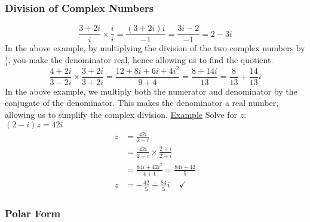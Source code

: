\documentclass[a4paper]{article}
\begin{document}
			\subsubsection{Division of Complex Numbers}
				\[
					\frac{3+2i}{i}\times\frac{i}{i}=\frac{(3+2i)i}{-1}=\frac{3i-2}{-1}=2-3i
				\]
				In the above example, by multiplying the division of the two complex numbers by $\frac{i}{i}$, you make the denominator real, hence allowing us to find the quotient.
				\[
					\frac{4+2i}{3-2i}\times\frac{3+2i}{3+2i}=\frac{12+8i+6i+4i^2}{9+4}=\frac{8+14i}{13}=\frac{8}{13}+\frac{14}{13}i
				\]
				In the above example, we multiply both the numerator and denominator by the conjugate of the denominator. This makes the denominator a real number, allowing us to simplify the complex division.\newline\newline
				\underline{Example}\newline
				Solve for $z$: $(2-i)z=42i$\newline
				\begin{align*}
					z&=\frac{42i}{2-i} \\
					&=\frac{42i}{2-i}\times\frac{2+i}{2+i} \\
					&=\frac{84i+42i^2}{4+1}=\frac{84i-42}{5} \\
					z&=-\frac{42}{5}+\frac{84}{5}i \;\;\;\;\checkmark
				\end{align*}
			\subsubsection{Polar Form}
\end{document}
